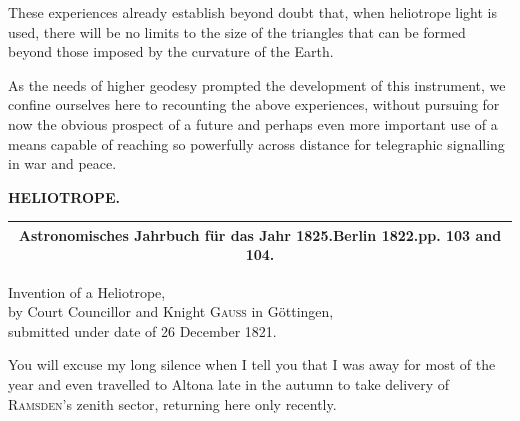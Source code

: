 \par\noindent\hspace*{\parindent}These experiences already establish beyond doubt that, when heliotrope light is used, there will be no limits to the size of the triangles that can be formed beyond those imposed by the curvature of the Earth.

\par\noindent\hspace*{\parindent}As the needs of higher geodesy prompted the development of this instrument, we confine ourselves here to recounting the above experiences, without pursuing for now the obvious prospect of a future and perhaps even more important use of a means capable of reaching so powerfully across distance for telegraphic signalling in war and peace.
\par\vfill\noindent{}\par

\clearpage
\noindent{}\hfill{\small\textbf{HELIOTROPE.}}\hfill\null\par\bigskip\bigskip
\begin{center}
\begin{tabular}{c}\hline
\small\textbf{Astronomisches Jahrbuch für das Jahr 1825.\quad Berlin 1822.\quad pp. 103 and 104.}\\\hline
\end{tabular}\par\bigskip
{\large Invention of a Heliotrope,\\
by Court Councillor and Knight \textsc{Gauss} in Göttingen,\\
submitted under date of 26 December 1821.}
\end{center}
\par\noindent\hspace*{\parindent}You will excuse my long silence when I tell you that I was away for most of the year and even travelled to Altona late in the autumn to take delivery of \textsc{Ramsden}'s zenith sector, returning here only recently.

